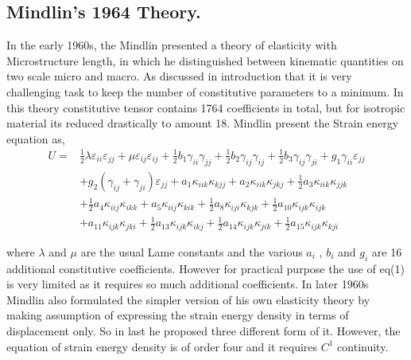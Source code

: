 \documentclass[12pt]{article}
\begin{document}
\subsection{Mindlin's 1964 Theory.}
In the early 1960s, the Mindlin presented \cite{mindlin1968first} a theory of elasticity with Microstructure length, in which he distinguished between kinematic quantities on two scale micro and macro. As discussed in introduction that it is very challenging task to keep the number of constitutive parameters to a minimum. In this theory constitutive tensor contains 1764 coefficients in total, but for isotropic material its reduced drastically to amount 18. Mindlin present the Strain energy equation as,
\begin{equation}\label{first}
\begin{aligned}
U= &\frac{1}{2}\lambda\varepsilon_{ii}\varepsilon_{jj}+\mu\varepsilon_{ij}\varepsilon_{ij}+\frac{1}{2}b_1 \gamma_{ii} \gamma_{jj}+\frac{1}{2}b_2 \gamma_{ij} \gamma_{ij}+\frac{1}{2}b_3 \gamma_{ij} \gamma_{ji}+g_1\gamma_{ii}\varepsilon_{jj}
\\   
&+g_2(\gamma_{ij}+\gamma_{ji})\varepsilon_{jj}+a_1\kappa_{iik}\kappa_{kjj}+a_2\kappa_{iik}\kappa_{jkj}+\frac{1}{2}a_3\kappa_{iik}\kappa_{jjk}
\\
&+\frac{1}{2}a_4\kappa_{iij}\kappa_{ikk}
 +a_5\kappa_{iij}\kappa_{kik}
+\frac{1}{2}a_8\kappa_{iji}\kappa_{kjk}+\frac{1}{2}a_{10}\kappa_{ijk}\kappa_{ijk}
\\
&+a_{11}\kappa_{ijk}\kappa_{jki}+\frac{1}{2}a_{13}\kappa_{ijk}\kappa_{ikj}
+\frac{1}{2}a_{14}\kappa_{ijk}\kappa_{jik}
+\frac{1}{2}a_{15}\kappa_{ijk}\kappa_{kji}
\end{aligned}
\end{equation}  

where $\lambda$ and $\mu$ are the usual Lame constants and the various $a_i$ , $b_i$ and $g_i$ are 16 additional constitutive coefficients. However for practical purpose the use of eq(1) is very limited as it requires so much additional coefficients. In later 1960s Mindlin also formulated the simpler version of his own elasticity theory by making assumption of expressing the strain energy density in terms of displacement only. So in last he proposed three different form of it. However, the equation of strain energy density is of order four and it requires $C^{1}$ continuity.
\newpage
\end{document}
